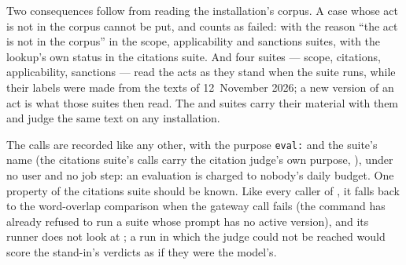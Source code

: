 Two consequences follow from reading the installation's corpus. A case whose act is not in
the corpus cannot be put, and counts as failed: with the reason \enquote{the act is not in the
corpus} in the scope, applicability and sanctions suites, with the lookup's own status
 in the citations suite. And four suites --- scope, citations, applicability, sanctions --- read the acts as
they stand when the suite runs, while their labels were made from the texts of
12~November 2026; a new version of an act is what those suites then read. The  and
 suites carry their material with them and judge the same text on any
installation.

The calls are recorded like any other, with the purpose \texttt{eval:} and the suite's name
(the citations suite's calls carry the citation judge's own purpose, ),
under no user and no job step: an evaluation is charged to nobody's daily budget. One
property of the citations suite should be known. Like every caller of ,
it falls back to the word-overlap comparison when the gateway call fails (the command has
already refused to run a suite whose prompt has no active version), and its runner does not
look at ; a run in which the judge
could not be reached would score the stand-in's verdicts as if they were the model's.

